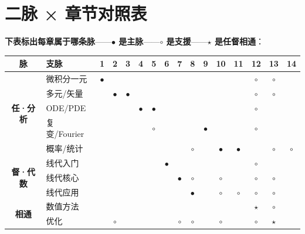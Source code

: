 \section*{二脉 × 章节对照表}

\textbf{下表标出每章属于哪条脉}——\textbf{$\bullet$ 是主脉}——\textbf{$\circ$ 是支援}——\textbf{$\star$ 是任督相通}：

\vspace{0.3cm}

\begin{center}
\small
\begin{tabular}{|c|p{2.6cm}|c|c|c|c|c|c|c|c|c|c|c|c|c|c|}
\hline
\textbf{脉} & \textbf{支脉} & 1 & 2 & 3 & 4 & 5 & 6 & 7 & 8 & 9 & 10 & 11 & 12 & 13 & 14 \\
\hline
\multirow{5}{*}{\parbox{0.9cm}{\centering\textbf{任·分析}}}
& 微积分一元   & $\bullet$ &   &   &   &   &   &   &   &   &   &   & $\circ$ & $\circ$ & \\
\cline{2-16}
& 多元/矢量    & & $\bullet$ & $\bullet$ &   &   &   &   &   &   &   &   & $\circ$ & $\circ$ & \\
\cline{2-16}
& ODE/PDE      & &   &   & $\bullet$ & $\bullet$ &   &   &   &   &   &   & $\circ$ &   & \\
\cline{2-16}
& 复变/Fourier & &   &   &   & $\circ$ &   &   &   & $\bullet$ &   &   & $\circ$ &   & \\
\cline{2-16}
& 概率/统计    & &   &   &   &   &   &   & $\circ$ &   & $\bullet$ & $\bullet$ &   & $\circ$ & $\circ$ \\
\hline
\multirow{3}{*}{\parbox{0.9cm}{\centering\textbf{督·代数}}}
& 线代入门     & &   &   &   &   & $\bullet$ &   &   &   &   &   & $\circ$ &   & \\
\cline{2-16}
& 线代核心     & &   &   &   &   &   & $\bullet$ & $\circ$ &   & $\circ$ &   & $\circ$ & $\circ$ & \\
\cline{2-16}
& 线代应用     & &   &   &   &   &   &   & $\bullet$ &   & $\circ$ & $\circ$ & $\circ$ & $\circ$ & \\
\hline
\multirow{2}{*}{\parbox{0.9cm}{\centering\textbf{相通}}}
& 数值方法     & &   &   &   &   &   &   &   &   &   &   & $\star$ & $\circ$ & \\
\cline{2-16}
& 优化         & & $\circ$ &   &   &   &   & $\circ$ & $\circ$ &   & $\circ$ &   & $\circ$ & $\star$ & \\
\hline
\end{tabular}
\end{center}

\vspace{0.3cm}

